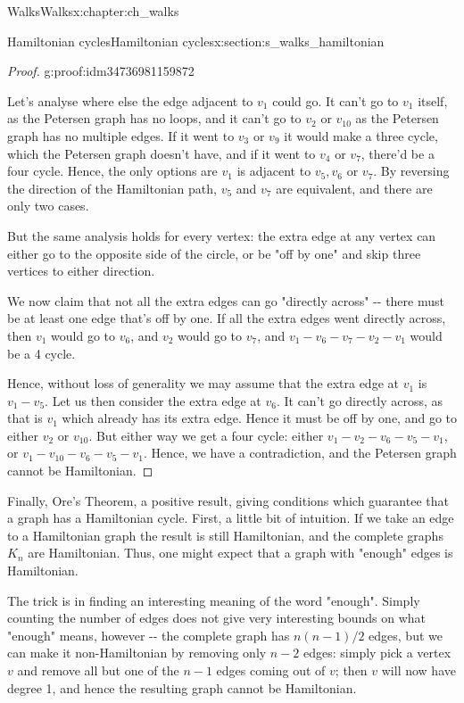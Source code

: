 \documentclass[oneside,10pt,]{book}
\numberwithin{equation}{section}
\begin{document}
\begin{chapterptx}{Walks}{}{Walks}{}{}{x:chapter:ch_walks}
\begin{sectionptx}{Hamiltonian cycles}{}{Hamiltonian cycles}{}{}{x:section:s_walks_hamiltonian}
\begin{proof}{}{g:proof:idm34736981159872}
\par
Let's analyse where else the edge adjacent to \(v_1\) could go.  It can't go to \(v_1\) itself, as the Petersen graph has no loops, and it can't go to \(v_2\) or \(v_{10}\) as the Petersen graph has no multiple edges.  If it went to \(v_3\) or \(v_9\) it would make a three cycle, which the Petersen graph doesn't have, and if it went to \(v_4\) or \(v_7\), there'd be a four cycle.  Hence, the only options are \(v_1\) is adjacent to \(v_5, v_6\) or \(v_7\).  By reversing the direction of the Hamiltonian path, \(v_5\) and \(v_7\) are equivalent, and there are only two cases.%
\par
But the same analysis holds for every vertex: the extra edge at any vertex can either go to the opposite side of the circle, or be "off by one" and skip three vertices to either direction.%
\par
We now claim that not all the extra edges can go "directly across" -{}-{} there must be at least one edge that's off by one.  If all the extra edges went directly across, then \(v_1\) would go to \(v_6\), and \(v_2\) would go to \(v_7\), and \(v_1-v_6-v_7-v_2-v_1\) would be a 4 cycle.%
\par
Hence, without loss of generality we may assume that the extra edge at \(v_1\) is \(v_1-v_5\).  Let us then consider the extra edge at \(v_6\).  It can't go directly across, as that is \(v_1\) which already has its extra edge.  Hence it must be off by one, and go to either \(v_2\) or \(v_{10}\).  But either way we get a four cycle: either \(v_1-v_2-v_6-v_5-v_1\), or \(v_1-v_{10}-v_6-v_5-v_1\).  Hence, we have a contradiction, and the Petersen graph cannot be Hamiltonian.%
\end{proof}
Finally, Ore's Theorem, a positive result, giving conditions which guarantee that a graph has a Hamiltonian cycle.  First, a little bit of intuition.  If we take an edge to a Hamiltonian graph the result is still Hamiltonian, and the complete graphs \(K_n\) are Hamiltonian.  Thus, one might expect that a graph with "enough" edges is Hamiltonian.%
\par
The trick is in finding an interesting meaning of the word "enough".  Simply counting the number of edges does not give very interesting bounds on what "enough" means, however -{}-{} the complete graph has \(n(n-1)/2\) edges, but we can make it non-Hamiltonian by removing only \(n-2\) edges: simply pick a vertex \(v\) and remove all but one of the \(n-1\) edges coming out of \(v\); then \(v\) will now have degree 1, and hence the resulting graph cannot be Hamiltonian.%

\end{sectionptx}
\end{chapterptx}
\end{document}
